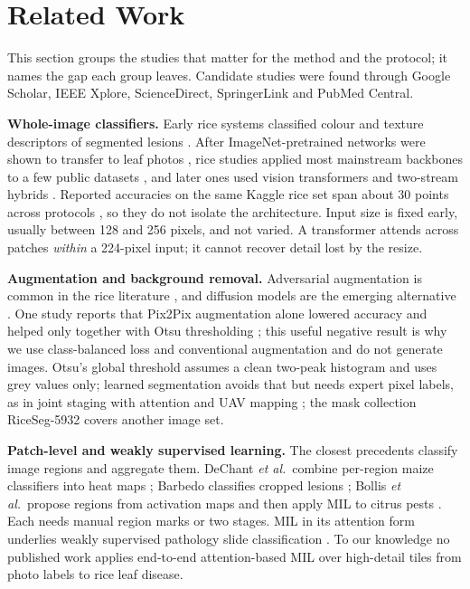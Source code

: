 \section{Related Work}
\label{sec:related}

This section groups the studies that matter for the method and the protocol; it names the gap each group leaves.
Candidate studies were found through Google Scholar, IEEE Xplore, ScienceDirect, SpringerLink and PubMed Central.

\textbf{Whole-image classifiers.} Early rice systems classified colour and texture descriptors of segmented lesions
\cite{orillo2014, pugoy2011, azim2021, sethy2020}. After ImageNet-pretrained networks were shown to transfer to leaf
photos \cite{mohanty2016}, rice studies applied most mainstream backbones to a few public datasets
\cite{lu2017, chen2020, ghosal2020, tejaswini2022}, and later ones used vision transformers and two-stream hybrids
\cite{dosovitskiy2021, he2016, alfalluji2025, vitresnet2025, globallocal2026}. Reported accuracies on the same Kaggle
rice set span about 30 points across protocols \cite{thakur2023, tejaswini2022, ali2026}, so they do not isolate the
architecture. Input size is fixed early, usually between 128 and 256 pixels, and not varied.
A transformer attends across patches \emph{within} a 224-pixel input; it cannot recover detail lost by the resize.

\textbf{Augmentation and background removal.} Adversarial augmentation is common in the rice literature
\cite{ali2026, fhwd2025, isola2017}, and diffusion models are the emerging alternative \cite{muhammad2023}.
One study reports that Pix2Pix augmentation alone lowered accuracy and helped only together with Otsu thresholding
\cite{ali2026}; this useful negative result is why we use class-balanced loss and conventional augmentation and do not
generate images. Otsu's global threshold \cite{otsu1979} assumes a clean two-peak histogram and uses grey values only; learned segmentation
avoids that but needs expert pixel labels, as in joint staging with attention \cite{sudhesh2025} and UAV mapping \cite{logavitool2025}; the
mask collection RiceSeg-5932 \cite{riceseg2025} covers another image set.

\textbf{Patch-level and weakly supervised learning.} The closest precedents classify image regions and aggregate them.
DeChant \textit{et al.}\ combine per-region maize classifiers into heat maps \cite{dechant2017}; Barbedo classifies
cropped lesions \cite{barbedo2019}; Bollis \textit{et al.}\ propose regions from activation maps and then apply MIL to
citrus pests \cite{bollis2020}. Each needs manual region marks or two stages. MIL \cite{dietterich1997} in its
attention form \cite{ilse2018} underlies weakly supervised pathology slide classification
\cite{lu2021clam, shao2021transmil}. To our knowledge no published work applies end-to-end attention-based MIL over
high-detail tiles from photo labels to rice leaf disease.

